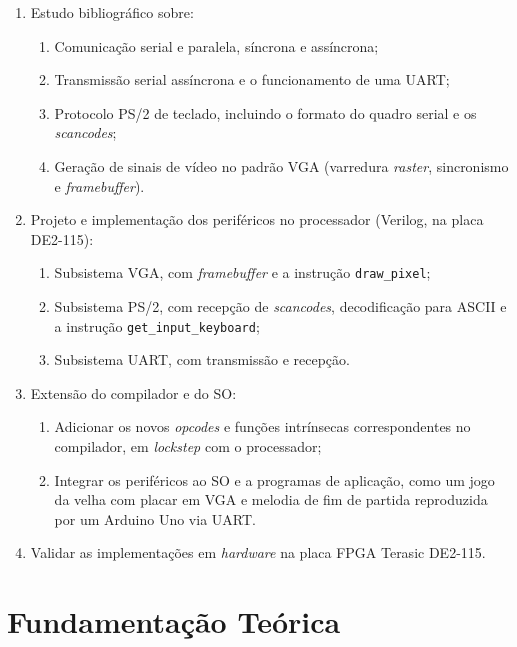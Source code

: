 \documentclass[
	12pt,
	oneside,
	a4paper,
	english,
	french,
	spanish,
	brazil,
	]{abntex2}
\begin{document}
\begin{enumerate}
	\item Estudo bibliográfico sobre:
		\begin{enumerate}
			\item Comunicação serial e paralela, síncrona e assíncrona;
			\item Transmissão serial assíncrona e o funcionamento de uma UART;
			\item Protocolo PS/2 de teclado, incluindo o formato do quadro serial e os \emph{scancodes};
			\item Geração de sinais de vídeo no padrão VGA (varredura \emph{raster}, sincronismo e \emph{framebuffer}).
		\end{enumerate}
	\item Projeto e implementação dos periféricos no processador (Verilog, na placa DE2-115):
		\begin{enumerate}
			\item Subsistema VGA, com \emph{framebuffer} e a instrução \texttt{draw\_pixel};
			\item Subsistema PS/2, com recepção de \emph{scancodes}, decodificação para ASCII e a instrução \texttt{get\_input\_keyboard};
			\item Subsistema UART, com transmissão e recepção.
		\end{enumerate}
	\item Extensão do compilador e do SO:
		\begin{enumerate}
			\item Adicionar os novos \emph{opcodes} e funções intrínsecas correspondentes no compilador, em \emph{lockstep} com o processador;
			\item Integrar os periféricos ao SO e a programas de aplicação, como um jogo da velha com placar em VGA e melodia de fim de partida reproduzida por um Arduino Uno via UART.
		\end{enumerate}
	\item Validar as implementações em \emph{hardware} na placa FPGA Terasic DE2-115.
\end{enumerate}

\chapter{Fundamentação Teórica}
\end{document}
